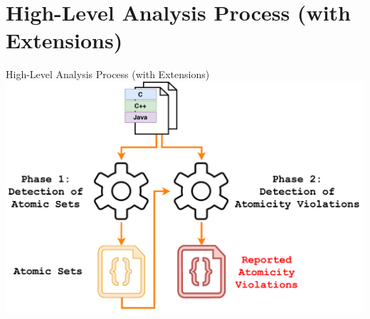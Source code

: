 \documentclass[%
    10pt, xcolor=pdflatex, hyperref={unicode}, aspectratio=169%
]{beamer}
\begin{document}
\section{High-Level Analysis Process (with Extensions)}
\begin{frame}{High-Level Analysis Process (with Extensions)}
    \centering
    \includegraphics[width=.8 \linewidth]{img/analyser-proposal-sets.pdf}
\end{frame}


\end{document}
